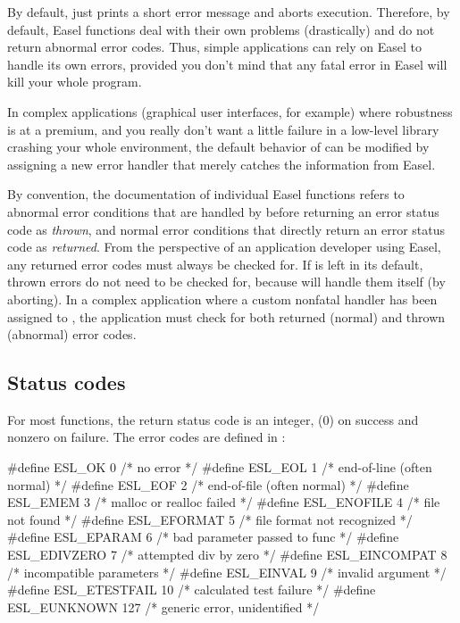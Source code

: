 \documentclass[11pt]{article}
\begin{document}
By default,  just prints a short error message and
aborts execution. Therefore, by default, Easel functions deal with
their own problems (drastically) and do not return abnormal error
codes. Thus, simple applications can rely on Easel to handle its own
errors, provided you don't mind that any fatal error in Easel will
kill your whole program.

In complex applications (graphical user interfaces, for example) where
robustness is at a premium, and you really don't want a little failure
in a low-level library crashing your whole environment, the default
behavior of  can be modified by assigning a new
error handler that merely catches the information from Easel.

By convention, the documentation of individual Easel functions refers
to abnormal error conditions that are handled by 
before returning an error status code as \emph{thrown}, and normal
error conditions that directly return an error status code as
\emph{returned}.  From the perspective of an application developer
using Easel, any returned error codes must always be checked for. If
 is left in its default, thrown errors do not need
to be checked for, because  will handle them itself
(by aborting). In a complex application where a custom nonfatal
handler has been assigned to , the application
must check for both returned (normal) and thrown (abnormal) error
codes.

\subsection{Status codes}

For most functions, the return status code is an integer,
 (0) on success and nonzero on failure. The error
codes are defined in :

\begin{cchunk}
#define ESL_OK         0	/* no error                     */
#define ESL_EOL        1	/* end-of-line (often normal)   */
#define ESL_EOF        2	/* end-of-file (often normal)   */
#define ESL_EMEM       3	/* malloc or realloc failed     */
#define ESL_ENOFILE    4	/* file not found               */
#define ESL_EFORMAT    5	/* file format not recognized   */
#define ESL_EPARAM     6	/* bad parameter passed to func */
#define ESL_EDIVZERO   7	/* attempted div by zero        */
#define ESL_EINCOMPAT  8	/* incompatible parameters      */
#define ESL_EINVAL     9	/* invalid argument             */
#define ESL_ETESTFAIL  10	/* calculated test failure      */
#define ESL_EUNKNOWN   127      /* generic error, unidentified  */
\end{cchunk}
\end{document}
